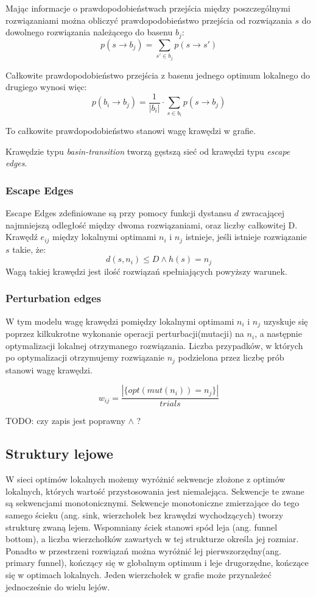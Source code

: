 Mając informacje o prawdopodobieństwach przejścia między poszczególnymi rozwiązaniami można obliczyć prawdopodobieństwo
przejścia od rozwiązania $s$ do dowolnego rozwiązania należącego do basenu $b_j$:
$$p(s \rightarrow b_j) = \sum_{s'\in{b_j}} p(s \rightarrow s')$$

Całkowite prawdopodobieństwo przejścia z basenu jednego optimum lokalnego do drugiego wynosi więc:
$$p(b_i \rightarrow b_j) = \frac{1}{|b_i|} \cdot \sum_{s\in{b_i}} p(s \rightarrow b_j)$$

To całkowite prawdopodobieństwo stanowi wagę krawędzi w grafie.

Krawędzie typu \textit{basin-transition} tworzą gęstszą sieć od krawędzi typu \textit{escape edges}.

\subsubsection*{Escape Edges}
Escape Edges zdefiniowane są przy pomocy funkcji dystansu $d$ zwracającej najmniejszą odległość między dwoma rozwiązaniami,
oraz liczby całkowitej D.
Krawędź $e_{ij}$ między lokalnymi optimami $n_i$ i $n_j$ istnieje, jeśli istnieje rozwiązanie $s$ takie, że:
\begin{equation}
      \label{eq:escape_edge_cond}
      d(s, n_i) \leq D \land h(s)=n_j
\end{equation}
Wagą takiej krawędzi jest ilość rozwiązań spełniających powyższy warunek.

\subsubsection{Perturbation edges}
W tym modelu wagę krawędzi pomiędzy lokalnymi optimami $n_i$ i $n_j$ uzyskuje się poprzez kilkukrotne wykonanie
operacji perturbacji(mutacji) na $n_i$, a następnie optymalizacji lokalnej otrzymanego rozwiązania.
Liczba przypadków, w których po optymalizacji otrzymujemy rozwiązanie $n_j$ podzielona przez liczbę prób stanowi wagę krawędzi.

$$
      w_{ij} = \frac{ |\{opt(mut(n_i)) = n_j\}| }{trials}
$$

TODO: czy zapis jest poprawny $\land$ ?

\subsection{Struktury lejowe}
W sieci optimów lokalnych możemy wyróżnić sekwencje złożone z optimów lokalnych, których wartość przystosowania jest niemalejąca.
Sekwencje te zwane są sekwencjami monotonicznymi\cite{DBLP:journals/heuristics/OchoaV18}.
Sekwencje monotoniczne zmierzające do tego samego ścieku (ang. sink, wierzchołek bez krawędzi wychodzących)
tworzy strukturę zwaną lejem. Wspomniany ściek stanowi spód leja (ang. funnel bottom), a liczba wierzchołków zawartych w tej strukturze określa jej rozmiar.
Ponadto w przestrzeni rozwiązań można wyróżnić lej pierwszorzędny(ang. primary funnel), kończący się w globalnym optimum i leje drugorzędne,
kończące się w optimach lokalnych. Jeden wierzchołek w grafie może przynależeć jednocześnie do wielu lejów.

